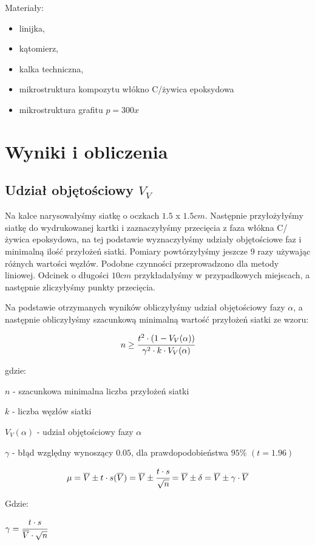 \documentclass[a4paper,12pt]{article}
\begin{document}
Materiały:
\begin{itemize}
    \item linijka,
    \item kątomierz,
    \item kalka techniczna,
    \item mikrostruktura kompozytu włókno C/żywica epoksydowa
    \item mikrostruktura grafitu $p=300x$
\end{itemize}


\section{Wyniki i obliczenia}

\subsection{Udział objętościowy $V_V$}

Na kalce narysowałyśmy siatkę o oczkach $1.5$ x $1.5 cm$. Następnie przyłożyłyśmy siatkę do wydrukowanej kartki i zaznaczyłyśmy przecięcia z faza włókna C/żywica epoksydowa, na tej podstawie wyznaczyłyśmy udziały objętościowe faz i minimalną ilość przyłożeń siatki. Pomiary powtórzyłyśmy jeszcze 9 razy używając różnych wartości węzłów. Podobne czynności przeprowadzono dla metody liniowej. Odcinek o długości $10cm$ przykładałyśmy w przypadkowych miejscach, a następnie zliczyłyśmy punkty przecięcia. 

Na podstawie otrzymanych wyników obliczyłyśmy udział objętościowy fazy $\alpha$, a następnie obliczyłyśmy szacunkową minimalną wartość przyłożeń siatki ze wzoru:

$$n\ge \cfrac{t^2 \cdot (1-V_V(\alpha))}{\gamma^2 \cdot k \cdot V_V(\alpha)}$$

gdzie:

$n$ - szacunkowa minimalna liczba przyłożeń siatki

$k$ - liczba węzłów siatki

$V_V(\alpha)$ - udział objętościowy fazy $\alpha$

$\gamma$ - błąd względny wynoszący $0.05$, dla prawdopodobieństwa $95\%$ $(t=1.96)$
\newpage

$$\mu=\overline{V}\pm t \cdot s(\overline{V})=\overline{V}\pm \cfrac{t\cdot s}{\sqrt{n}}=\overline{V}\pm \delta = \overline{V}\pm \gamma \cdot \overline{V}$$

Gdzie:

$\gamma=\cfrac{t\cdot s}{\overline{V}\cdot \sqrt{n}}$
\end{document}
